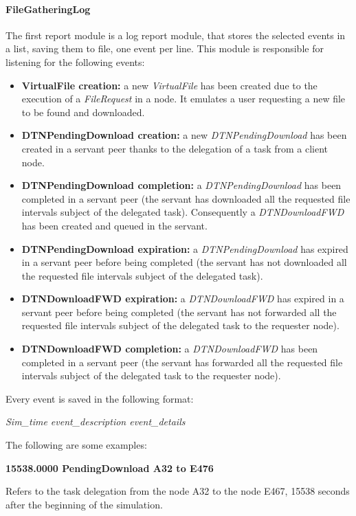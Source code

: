 \paragraph{FileGatheringLog}
The first report module is a log report module, that stores the selected events in a list, saving them to file, one event per line. This module is responsible for listening for the following events:
\begin{itemize}
\item \textbf{VirtualFile creation:} a new \textit{VirtualFile} has been created due to the execution of a \textit{FileRequest} in a node. It emulates a user requesting a new file to be found and downloaded.
\item \textbf{DTNPendingDownload creation:} a new \textit{DTNPendingDownload} has been created in a servant peer thanks to the delegation of a task from a client node.
\item \textbf{DTNPendingDownload completion:} a \textit{DTNPendingDownload} has been completed in a servant peer (the servant has downloaded all the requested file intervals subject of the delegated task). Consequently a \textit{DTNDownloadFWD} has been created and queued in the servant.
\item \textbf{DTNPendingDownload expiration:} a \textit{DTNPendingDownload} has expired in a servant peer before being completed (the servant has not downloaded all the requested file intervals subject of the delegated task).
\item \textbf{DTNDownloadFWD expiration:} a \textit{DTNDownloadFWD} has expired in a servant peer before being completed (the servant has not forwarded all the requested file intervals subject of the delegated task to the requester node).
\item \textbf{DTNDownloadFWD completion:} a \textit{DTNDownloadFWD} has been completed in a servant peer (the servant has forwarded all the requested file intervals subject of the delegated task to the requester node).
\end{itemize}

Every event is saved in the following format:
\begin{center}
\textit{Sim\_time	event\_description	event\_details}
\end{center}
The following are some examples:

\begin{center}
\textbf{15538.0000	PendingDownload	A32 to E476}
\end{center}
Refers to the task delegation from the node A32 to the node E467, 15538 seconds after the beginning of the simulation.
\\

